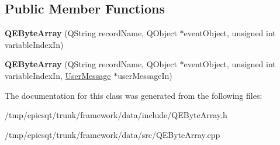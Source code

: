 \subsection*{Public Member Functions}
\begin{DoxyCompactItemize}
\item 
\hypertarget{classQEByteArray_a0552b9a37a6713e45034b7644eee4242}{
{\bfseries QEByteArray} (QString recordName, QObject $\ast$eventObject, unsigned int variableIndexIn)}
\label{classQEByteArray_a0552b9a37a6713e45034b7644eee4242}

\item 
\hypertarget{classQEByteArray_ab2ed00b69361a861a7a82ae9bb4b746f}{
{\bfseries QEByteArray} (QString recordName, QObject $\ast$eventObject, unsigned int variableIndexIn, \hyperlink{classUserMessage}{UserMessage} $\ast$userMessageIn)}
\label{classQEByteArray_ab2ed00b69361a861a7a82ae9bb4b746f}

\end{DoxyCompactItemize}


The documentation for this class was generated from the following files:\begin{DoxyCompactItemize}
\item 
/tmp/epicsqt/trunk/framework/data/include/QEByteArray.h\item 
/tmp/epicsqt/trunk/framework/data/src/QEByteArray.cpp\end{DoxyCompactItemize}
